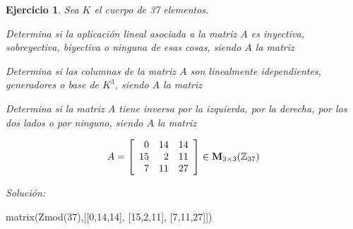 \documentclass[12pt]{amsart}
\newtheorem{ejer}{Ejercicio}
\begin{document}
\begin{ejer} Sea $K$ el cuerpo de 37 elementos.
\newline
\noindent\begin{minipage}{\textwidth}
\begin{tcolorbox}[colback = green!20!white,title=Versión Aplicaciones]
Determina si la aplicaci\'on lineal asociada a la matriz $A$ es inyectiva, sobreyectiva, biyectiva o ninguna de esas cosas, siendo $A$ la matriz \end{tcolorbox}
\end{minipage} \newline
\noindent\begin{minipage}{\textwidth}
\begin{tcolorbox}[colback = blue!20!white,title=Versión Vectores]
Determina si las columnas de la matriz $A$ son linealmente idependientes, generadores o base de $K^{3}$, siendo $A$ la matriz \end{tcolorbox}
\end{minipage} \newline
\noindent\begin{minipage}{\textwidth} 
\begin{tcolorbox}[colback = red!20!white,title=Versión Inversas]
Determina si la matriz $A$ tiene inversa por la izquierda, por la derecha, por los dos lados o por ninguno, siendo $A$ la matriz 
\end{tcolorbox}
\end{minipage}
\[ A = \left[\begin{array}{rrr}
0 & 14 & 14 \\
15 & 2 & 11 \\
7 & 11 & 27
\end{array}\right] \in {\bf M}_{3\times 3}({\mathbb Z}_{37})\]
\end{ejer}

{\it Soluci\'on:}

\begin{sageblock}
matrix(Zmod(37),[[0,14,14],
[15,2,11],
[7,11,27]])
\end{sageblock}

\end{document}
